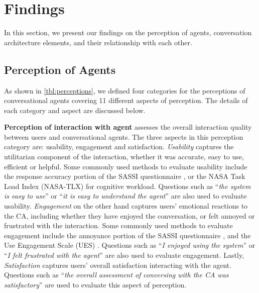 
\section{Findings}

In this section, we present our findings on the perception of agents, conversation architecture elements, and their relationship with each other.

\subsection{Perception of Agents}

As shown in \autoref{tbl:perceptions}, we defined four categories for the perceptions of conversational agents covering 11 different aspects of perception. The details of each category and aspect are discussed below.


\textbf{Perception of interaction with agent} assesses the overall interaction quality between users and conversational agents. The three aspects in this perception category  are: usability, engagement and satisfaction. \textit{Usability} captures the utilitarian component of the interaction, whether it was accurate, easy to use, efficient or helpful. Some commonly used methods to evaluate usability include the response accuracy portion of the SASSI questionnaire \cite{hone2000towards}, or the NASA Task Load Index (NASA-TLX) \cite{hart1988development} for cognitive workload. Questions such as ``\textit{the system is easy to use}'' or ``\textit{it is easy to understand the agent}'' are also used to evaluate usability. \textit{Engagement} on the other hand captures users' emotional reactions to the CA, including whether they have enjoyed the conversation, or felt annoyed or frustrated with the interaction. Some commonly used methods to evaluate engagement include the annoyance portion of the SASSI questionnaire \cite{hone2000towards}, and the Use Engagement Scale (UES) \cite{o2018practical}. Questions such as ``\textit{I enjoyed using the system}'' or ``\textit{I felt frustrated with the agent}'' are also used to evaluate engagement. Lastly, \textit{Satisfaction} captures users' overall satisfaction interacting with the agent. Questions such as ``\textit{the overall assessment of conversing with the CA was satisfactory}'' are used to evaluate this aspect of perception.




